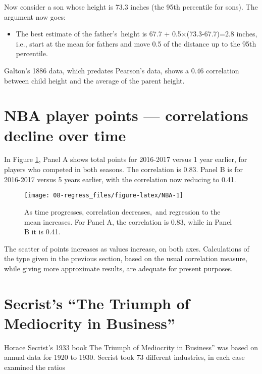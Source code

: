 \documentclass[
  10ptls,
  b5paper]{book}
\providecommand{\tightlist}{%
  \setlength{\itemsep}{0pt}\setlength{\parskip}{0pt}}
\begin{document}
Now consider a son whose height is 73.3 inches (the 95th percentile for sons). The argument now goes:

\begin{itemize}
\tightlist
\item
  The best estimate of the father's~height is 67.7 + 0.5\(\times\)(73.3-67.7)=2.8 inches, i.e., start at the mean for fathers and move 0.5 of the distance up to the 95th percentile.
\end{itemize}

Galton's 1886 data, which predates Pearson's data, shows a 0.46 correlation between child height and the average of the parent height.

\section{NBA player points --- correlations decline over time}\label{nba-player-points-correlations-decline-over-time}

In Figure \ref{fig:NBA}, Panel A shows total points for 2016-2017 versus 1 year earlier, for players who competed in both seasons. The correlation is 0.83. Panel B is for 2016-2017 versus 5 years earlier, with the correlation now reducing to 0.41.

\begin{figure}[H]

{\centering \texttt{[image: 08-regress\_files/figure-latex/NBA-1]} 

}

\caption{As time progresses, correlation decreases, and regression to the mean increases.  For Panel A, the correlation is 0.83, while in Panel B it is 0.41.}\label{fig:NBA}
\end{figure}

The scatter of points increases as values increase, on both axes. Calculations of the type given in the previous section, based on the usual correlation measure, while giving more approximate results, are adequate for present purposes.

\section{Secrist's ``The Triumph of Mediocrity in Business''}\label{secrists-the-triumph-of-mediocrity-in-business}

Horace Secrist's 1933 book The Triumph of Mediocrity in Business'' was based on annual data for 1920 to 1930. Secrist took 73 different industries, in each case examined the ratios
\end{document}
